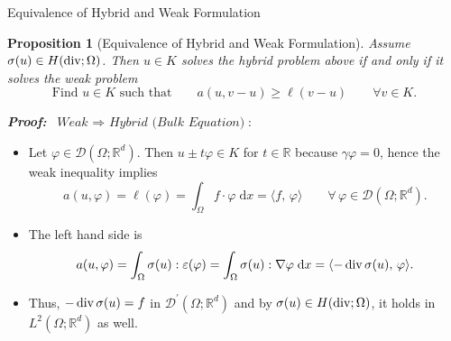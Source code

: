 \documentclass[10pt,aspectratio=169]{beamer}
\newtheorem{proposition}{Proposition}[section]
\def\R{{\mathbb R}}
\def\cD{{\mathcal D}}
\def\d{{\mathrm{d}}}
\def\dx{{\d x}}
\newcommand{\diver}{\operatornamewithlimits{div}}
\begin{document}
\begin{frame}{Equivalence of Hybrid and Weak Formulation}
	\begin{proposition}[Equivalence of Hybrid and Weak Formulation]
		Assume $\sigma(u)\in H(\diver;\Omega)$. Then $u\in K$ solves the hybrid problem above if and only if it solves the weak problem
		\begin{equation*}
			\text{Find }u\in K\text{ such that}\qquad a(u,v-u)\ge\ell(v-u)\qquad \forall v\in K.
		\end{equation*}
	\end{proposition}
	\textbf{\em Proof:} $\ \textit{Weak }\Rightarrow\textit{ Hybrid (Bulk Equation)}$:
	\begin{itemize}
		\item Let $\varphi\in \cD(\Omega;\R^d)$. Then $u\pm t\varphi\in K$ for $t\in\R$ because $\gamma\varphi = 0$, hence the weak inequality implies
		      \begin{equation*}
			      a(u,\varphi)=\ell(\varphi)=\int_\Omega f\cdot \varphi\;\dx = \langle f,\,\varphi\rangle\qquad \forall\,\varphi\in \cD(\Omega;\R^d).
		      \end{equation*}
		\item The left hand side is
		      \begin{equation*}
			      a(u,\varphi) = \int_\Omega\sigma(u):\varepsilon(\varphi) = \int_\Omega\sigma(u):\nabla\varphi\;\dx = \langle -\diver\sigma(u),\,\varphi\rangle.
		      \end{equation*}
		\item Thus, $-\diver\sigma(u) = f$ in $\cD^\prime(\Omega;\R^d)$ and by $\sigma(u)\in H(\diver;\Omega)$, it holds in $L^2(\Omega;\R^d)$ as well.
	\end{itemize}
\end{frame}
\end{document}
